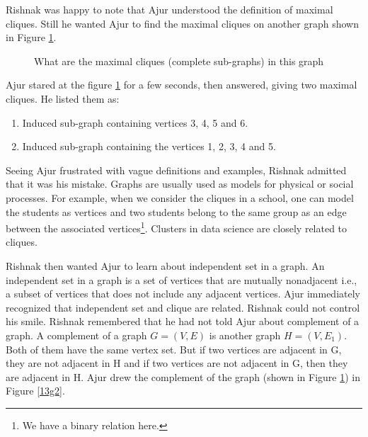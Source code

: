 Rishnak was happy to note that Ajur understood the definition of maximal cliques. Still he wanted Ajur to find the
maximal cliques on another graph shown in Figure \ref{13g21}.
\begin{figure}
\begin{center}
\caption{ What are the maximal cliques (complete sub-graphs) in this graph}\label{13g21}
\end{center}
\end{figure}

Ajur stared at the figure \ref{13g21} for a few seconds, then answered, giving two maximal cliques. He listed them as: 
\begin{enumerate}
    \item Induced sub-graph containing vertices 3, 4, 5 and 6.
    \item Induced sub-graph containing the vertices 1, 2, 3, 4 and 5.
\end{enumerate} 
Seeing Ajur frustrated with vague definitions and examples, Rishnak admitted that it was his mistake. Graphs are usually used as models for physical or social processes. For example, when we consider the cliques in a school, one can model the students as vertices and two students belong to the same group as an edge between the associated vertices\footnote{We have a binary relation here.}. Clusters in data science are closely related to cliques.

Rishnak then wanted Ajur to learn about independent set in a graph. An independent set in a graph is a set of vertices that are mutually nonadjacent i.e., a subset of vertices that does not include any adjacent vertices. Ajur immediately recognized that independent set and clique are related. Rishnak could not control his smile. Rishnak remembered that he had not told Ajur about complement of a graph. A complement of a graph $G=(V,E)$ is another graph $H=(V,E_1)$. Both of them have the same vertex set. But if two vertices are adjacent in G, they are not adjacent in H and if two vertices are not adjacent in G, then they are adjacent in H. Ajur drew the complement of the graph (shown in Figure \ref{13g21}) in Figure \ref{13g2}.

